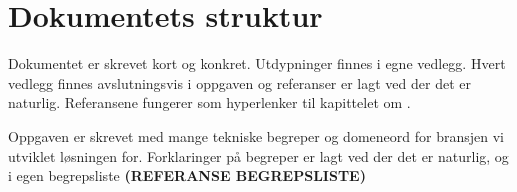 \chapter{\color{Millum}\textbf{Dokumentets struktur}}
Dokumentet er skrevet kort og konkret. Utdypninger finnes i egne vedlegg. Hvert vedlegg finnes avslutningsvis i oppgaven og referanser er lagt ved der det er naturlig. Referansene fungerer som hyperlenker til kapittelet om \textbf{}.\newline

Oppgaven er skrevet med mange tekniske begreper og domeneord for bransjen vi utviklet løsningen for. Forklaringer på begreper er lagt ved der det er naturlig, og i egen begrepsliste \textbf{(REFERANSE BEGREPSLISTE)}

